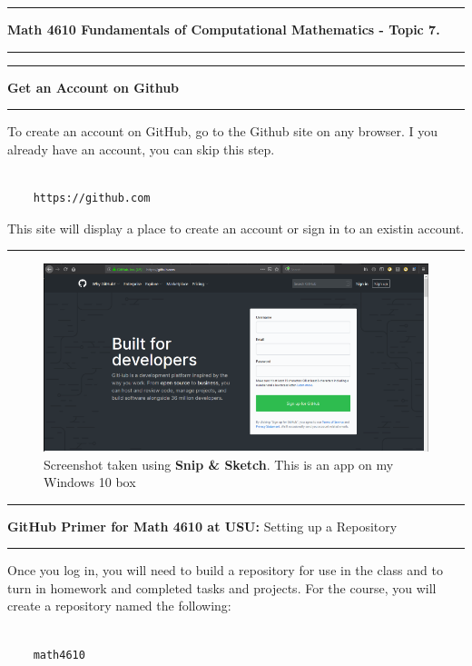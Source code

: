 \documentclass[10pt,fleqn]{article}
\begin{document}
\vskip0.1in\hrule\vskip0.1in \noindent
{\bf Math 4610 Fundamentals of Computational Mathematics  - Topic 7.}
\vskip0.1in\hrule\vskip0.1in \noindent
\vskip0.1in\hrule\vskip0.1in\noindent
\noindent
{\bf Get an Account on Github} 
\vskip0.1in\hrule\vskip0.1in\noindent
To create an account on GitHub, go to the Github site on any browser. I you
already have an account, you can skip this step.
\begin{verbatim}

    https://github.com

\end{verbatim}
This site will display a place to create an account or sign in to an existin
account.
\vskip0.1in\hrule\vskip0.1in
\vfill
\begin{figure}[h]
\centering
\includegraphics{../images/github_01.png}
\vskip0.1in
\caption{{Screenshot} taken using {\bf Snip \& Sketch}. This is an app on
         my Windows 10 box}
\end{figure}
\eject
\vskip0.1in\hrule\vskip0.1in
\noindent
{{\bf GitHub Primer for Math 4610 at USU:} Setting up a Repository} 
\vskip0.1in\hrule\vskip0.1in
\noindent
Once you log in, you will need to build a repository for use in the class and
to turn in homework and completed tasks and projects. For the course, you will
create a repository named the following:
\begin{verbatim}

    math4610

\end{verbatim}
\end{document}
